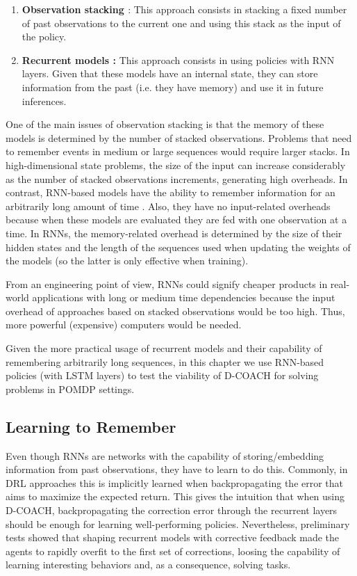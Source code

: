 \begin{enumerate}
    \item \textbf{Observation stacking \cite{atari}}: This approach consists in stacking a fixed number of past observations to the current one and using this stack as the input of the policy. 
    \item \textbf{Recurrent models \cite{hausknecht2015deep}:} This approach consists in using policies with RNN layers. Given that these models have an internal state, they can store information from the past (i.e. they have memory) and use it in future inferences. 
\end{enumerate}

One of the main issues of observation stacking is that the memory of these models is determined by the number of stacked observations. Problems that need to remember events in medium or large sequences would require larger stacks. In high-dimensional state problems, the size of the input can increase considerably as the number of stacked observations increments, generating high overheads. In contrast, RNN-based models have the ability to remember information for an arbitrarily long amount of time \cite{lample2017playing}.  Also, they have no input-related overheads because when these models are evaluated they are fed with one observation at a time. In RNNs, the memory-related overhead is determined by the size of their hidden states and the length of the sequences used when updating the weights of the models (so the latter is only effective when training).

From an engineering point of view, RNNs could signify cheaper products in real-world applications with long or medium time dependencies because the input overhead of approaches based on stacked observations would be too high. Thus, more powerful (expensive) computers would be needed.   

Given the more practical usage of recurrent models and their capability of remembering arbitrarily long sequences, in this chapter we use RNN-based policies (with LSTM layers) to test the viability of D-COACH for solving problems in POMDP settings. 

\subsection{Learning to Remember}
Even though RNNs are networks with the capability of storing/embedding information from past observations, they have to learn to do this. Commonly, in DRL approaches this is implicitly learned when backpropagating the error that aims to maximize the expected return. This gives the intuition that when using D-COACH, backpropagating the correction error through the recurrent layers should be enough for learning well-performing policies. Nevertheless, preliminary tests showed that shaping recurrent models with corrective feedback made the agents to rapidly overfit to the first set of corrections, loosing the capability of learning interesting behaviors and, as a consequence, solving tasks. 

